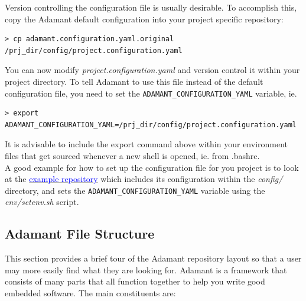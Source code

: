 Version controlling the configuration file is usually desirable. To accomplish this, copy the Adamant default configuration into your project specific repository:

\vspace{5mm} %
\begin{verbatim}
> cp adamant.configuration.yaml.original /prj_dir/config/project.configuration.yaml
\end{verbatim}
\vspace{5mm} %

You can now modify \textit{project.configuration.yaml} and version control it within your project directory. To tell Adamant to use this file instead of the default configuration file, you need to set the \texttt{ADAMANT\_CONFIGURATION\_YAML} variable, ie.

\vspace{5mm} %
\begin{verbatim}
> export ADAMANT_CONFIGURATION_YAML=/prj_dir/config/project.configuration.yaml
\end{verbatim}
\vspace{5mm} %

It is advisable to include the export command above within your environment files that get sourced whenever a new shell is opened, ie. from .bashrc. \\

A good example for how to set up the configuration file for you project is to look at the \href{https://github.com/lasp/adamant_example/tree/main}{\textcolor{blue}{example repository}} which includes its configuration within the \textit{config/} directory, and sets the \texttt{ADAMANT\_CONFIGURATION\_YAML} variable using the \textit{env/setenv.sh} script.

\subsection{Adamant File Structure}

This section provides a brief tour of the Adamant repository layout so that a user may more easily find what they are looking for. Adamant is a framework that consists of many parts that all function together to help you write good embedded software. The main constituents are:

